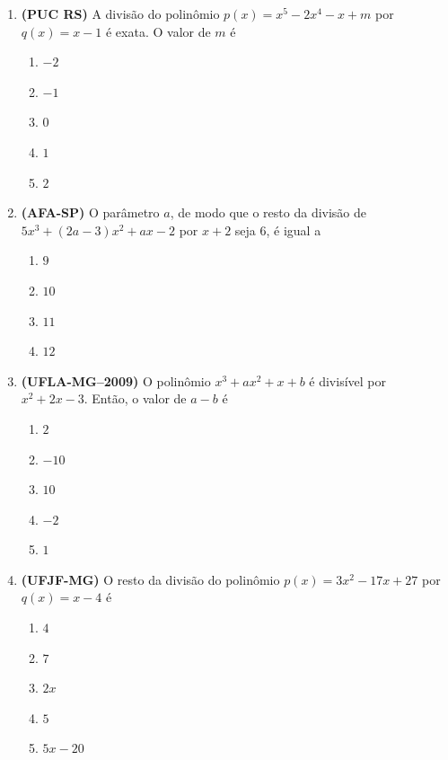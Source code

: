\documentclass[12pt,a4paper]{article}
\begin{document}
\begin{enumerate}[leftmargin=*, itemsep=0.35cm]
    \item \textbf{(PUC RS)} A divisão do polinômio $p(x) = x^5 - 2x^4 - x + m$ por $q(x) = x - 1$ é exata. O valor de $m$ é
    \begin{enumerate}[label=\Alph*)]
        \item $-2$
        \item $-1$
        \item $0$
        \item $1$
        \item $2$
    \end{enumerate}

    \setcounter{enumii}{7} %
    \item \textbf{(AFA-SP)} O parâmetro $a$, de modo que o resto da divisão de $5x^3 + (2a-3)x^2 + ax - 2$ por $x + 2$ seja 6, é igual a
    \begin{enumerate}[label=\Alph*)]
        \item $9$
        \item $10$
        \item $11$
        \item $12$
    \end{enumerate}

    \item \textbf{(UFLA-MG--2009)} O polinômio $x^3 + ax^2 + x + b$ é divisível por $x^2 + 2x - 3$. Então, o valor de $a - b$ é
    \begin{enumerate}[label=\Alph*)]
        \item $2$
        \item $-10$
        \item $10$
        \item $-2$
        \item $1$
    \end{enumerate}

    \item \textbf{(UFJF-MG)} O resto da divisão do polinômio $p(x) = 3x^2 - 17x + 27$ por $q(x) = x - 4$ é
    \begin{enumerate}[label=\Alph*)]
        \item $4$
        \item $7$
        \item $2x$
        \item $5$
        \item $5x - 20$
    \end{enumerate}


\end{enumerate}
\end{document}
